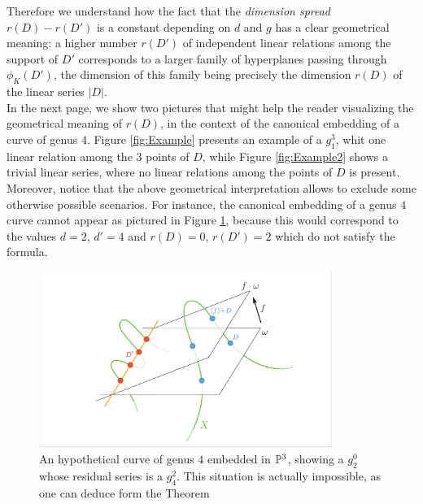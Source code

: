 	Therefore we understand how the fact that the \emph{dimension spread} $r(D)-r(D')$ is a constant depending on $d$ and $g$ has a clear geometrical meaning: a higher number $r(D')$ of independent linear relations among the support of $D'$ corresponds to a larger family of hyperplanes passing through $\phi_K(D')$, the dimension of this family being precisely the dimension $r(D)$ of the linear series $|D|$.\\  

	In the next page, we show two pictures that might help the reader visualizing the geometrical meaning of $r(D)$, in the context of the canonical embedding of a curve of genus $4$. Figure \ref{fig:Example} presents an example of a $g_1^3$, whit one linear relation among the $3$ points of $D$, while Figure \ref{fig:Example2} shows a trivial linear series, where no linear relations among the points of $D$ is present.\\

	Moreover, notice that the above geometrical interpretation allows to exclude some otherwise possible scenarios. For instance, the canonical embedding of a genus $4$ curve cannot appear as pictured in Figure \ref{fig:Impossible}, because this would correspond to the values $d=2$, $d'=4$ and $r(D)=0$, $r(D')=2$ which do not satisfy the \RR formula.
	\vspace{1.5em}
	\begin{figure}[H]
		\centering
		\includegraphics[width=0.85\textwidth]{Impossible.pdf}
		\caption{An hypothetical curve of genus $4$ embedded in $\mathbb{P}^3$, showing a $g_2^0$ whose residual series is a $g_4^2$. This situation is actually impossible, as one can deduce form the \RR Theorem }
		\label{fig:Impossible}
	\end{figure}


